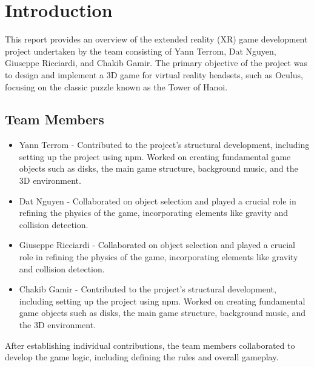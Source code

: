 \documentclass{article}
\begin{document}
\newpage


\tableofcontents

\newpage


\listoffigures

\newpage

\lstlistoflistings


\newpage



\section{Introduction}
This report provides an overview of the extended reality (XR) game development project undertaken by the team consisting of Yann Terrom, Dat Nguyen, Giuseppe Ricciardi, and Chakib Gamir. The primary objective of the project was to design and implement a 3D game for virtual reality headsets, such as Oculus, focusing on the classic puzzle known as the Tower of Hanoi.

\subsection{Team Members}
\begin{itemize}
    \item Yann Terrom - Contributed to the project's structural development, including setting up the project using npm. Worked on creating fundamental game objects such as disks, the main game structure, background music, and the 3D environment.

    \item Dat Nguyen - Collaborated on object selection and played a crucial role in refining the physics of the game, incorporating elements like gravity and collision detection.

    \item Giuseppe Ricciardi - Collaborated on object selection and played a crucial role in refining the physics of the game, incorporating elements like gravity and collision detection.

    \item Chakib Gamir - Contributed to the project's structural development, including setting up the project using npm. Worked on creating fundamental game objects such as disks, the main game structure, background music, and the 3D environment.

\end{itemize}

After establishing individual contributions, the team members collaborated to develop the game logic, including defining the rules and overall gameplay.
\end{document}
